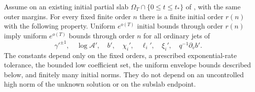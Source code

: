 \begin{lemma}\label{lem:dn-high-uniform}
Assume  on an existing initial partial slab
$\Omega_T\cap\{0\le t\le t_*\}$ of , with the same
outer margins.  For every fixed finite order $n$ there is a finite
initial order $r(n)$ with the following property.  Uniform
$e^{o(T)}$ initial bounds through order $r(n)$ imply uniform
$e^{o(T)}$ bounds through order $n$ for all ordinary jets of
\[
 \gamma'^{\pm1},\quad\log\mathcal A',\quad b',\quad
 \chi_i',\quad\ell_i',\quad\xi_i',\quad
                    q^{-1}\partial_vb'.
\]
The constants depend only on the fixed orders, a prescribed
exponential-rate tolerance, the bounded low coefficient set, the
uniform envelope bounds described below, and finitely many initial
norms.  They do not depend on an uncontrolled high norm of the
unknown solution or on the subslab endpoint.
\end{lemma}

